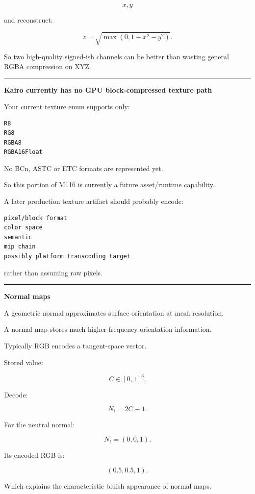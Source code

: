 \[
x,y
\]

and reconstruct:

\[
z=
\sqrt{
\max(
0,
1-x^2-y^2
)
}.
\]

So two high-quality signed-ish channels can be better than wasting general RGBA compression on XYZ.

\begin{center}\rule{0.5\linewidth}{0.5pt}\end{center}

\textbf{Kairo currently has no GPU block-compressed texture path}

Your current texture enum supports only:

\begin{verbatim}
R8
RG8
RGBA8
RGBA16Float
\end{verbatim}

No BCn, ASTC or ETC formats are represented yet.

So this portion of M116 is currently a future asset/runtime capability.

A later production texture artifact should probably encode:

\begin{verbatim}
pixel/block format
color space
semantic
mip chain
possibly platform transcoding target
\end{verbatim}

rather than assuming raw pixels.

\begin{center}\rule{0.5\linewidth}{0.5pt}\end{center}

\textbf{Normal maps}

A geometric normal approximates surface orientation at mesh resolution.

A normal map stores much higher-frequency orientation information.

Typically RGB encodes a tangent-space vector.

Stored value:

\[
C\in[0,1]^3.
\]

Decode:

\[
\boxed{
N_t=2C-1.
}
\]

For the neutral normal:

\[
N_t=(0,0,1).
\]

Its encoded RGB is:

\[
(0.5,0.5,1).
\]

Which explains the characteristic bluish appearance of normal maps.

